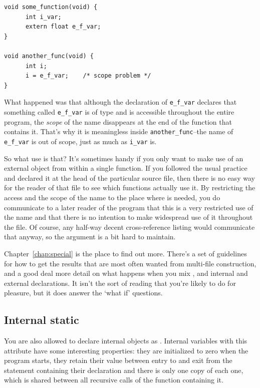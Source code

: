 \begin{Verbatim}
void some_function(void) {
      int i_var;
      extern float e_f_var;
}

void another_func(void) {
      int i;
      i = e_f_var;    /* scope problem */
}
\end{Verbatim}

   What happened was that although the declaration of
    \texttt{e\_f\_var} declares that something called \texttt{e\_f\_var}
    is of type \float{} and is accessible throughout the entire
    program, the \textit{scope} of the name disappears at the end of the
    function that contains it. That's why it is meaningless inside
    \texttt{another\_func}--the name of \texttt{e\_f\_var} is out
    of scope, just as much as \texttt{i\_var} is.


   So what use is that? It's sometimes handy if you only want to make use
    of an external object from within a single function. If you followed the
    usual practice and declared it at the head of the particular source
    file, then there is no easy way for the reader of that file to see which
    functions actually use it. By restricting the access and the scope of
    the name to the place where is needed, you do communicate to a later
    reader of the program that this is a very restricted use of the name and
    that there is no intention to make widespread use of it throughout the
    file. Of course, any half-way decent cross-reference listing would
    communicate that anyway, so the argument is a bit hard to maintain.


   Chapter~\ref{chap:special} is the place to find out more. There's a set of
    guidelines for how to get the results that are most often wanted from
    multi-file construction, and a good deal more detail on what happens
    when you mix \extern, \static{} and internal and
    external declarations. It isn't the sort of reading that you're likely
    to do for pleasure, but it does answer the `what if'
    questions.

  

  \subsection{Internal static}
   

   You are also allowed to declare internal objects as
    \static. Internal variables with this attribute have some
    interesting properties: they are initialized to zero when the program
    starts, they retain their value between entry to and exit from the
    statement containing their declaration and there is only one copy of
    each one, which is shared between all recursive calls of the function
    containing it.


